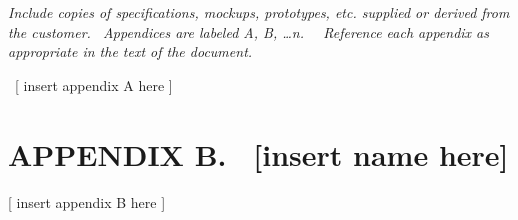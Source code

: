 \documentclass[twoside,letterpaper]{article}
\begin{document}
\bigskip

{\itshape\color{black}
Include copies of specifications, mockups, prototypes, etc. supplied or
derived from the customer. \ Appendices are labeled A, B, {\dots}n.
\ \ Reference each appendix as appropriate in the text of the document.
}

{\color{black}
\foreignlanguage{english}{\ }\foreignlanguage{english}{[ insert appendix
A here ]}}

\clearpage\pagestyle{Appendix}
\section[APPENDIX B. \ [insert name
here{]}]{\rmfamily\bfseries\color{black}
APPENDIX B. \ [insert name here]}

\bigskip

{\color{black}
[ insert appendix B here ]}

\bigskip
\end{document}
